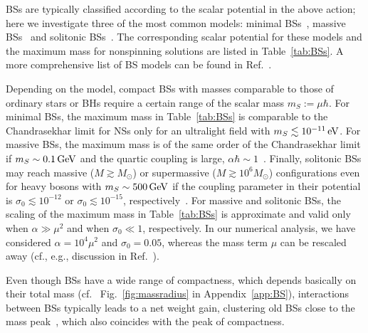 \documentclass[aps,twocolumn,showpacs,preprintnumbers,nofootinbib,prd,superscriptaddress,groupedaddress,10pt]{revtex4-1}
\begin{document}
BSs are typically classified according to the scalar potential in the above action; here we investigate three of the most common models:
minimal BSs~\cite{Kaup:1968zz,Ruffini:1969qy}, massive BSs~\cite{Colpi:1986ye} and
solitonic BSs~\cite{Friedberg:1986tq}. The corresponding scalar potential for these models and the maximum mass for nonspinning solutions are listed in Table~\ref{tab:BSs}. A more comprehensive list of BS models can be found in Ref.~\cite{Liebling:2012fv}.


Depending on the model, compact BSs with masses comparable to those of ordinary stars or BHs require a certain range of the scalar mass $m_S:= \mu \hbar$.
%
For minimal BSs, the maximum mass in Table~\ref{tab:BSs} is comparable to the Chandrasekhar limit for NSs only for an ultralight field with $m_S\lesssim 10^{-11}\,{\rm eV}$.
%
For massive BSs, the maximum mass is of the same order of the Chandrasekhar
limit if $m_S\sim 0.1\,{\rm GeV}$ and the quartic coupling is large, $\alpha\hbar\sim1$~\cite{Colpi:1986ye}.
%
Finally, solitonic BSs may reach massive ($M\gtrsim M_{\odot}$) or supermassive ($M\gtrsim 10^6 M_{\odot}$) configurations even for
heavy bosons with $m_S\sim 500\,{\rm GeV}$ if the coupling parameter in their potential is $\sigma_0\lesssim 10^{-12}$ or $\sigma_0\lesssim 10^{-15}$, respectively~\cite{Friedberg:1986tq}. For massive and solitonic BSs, the scaling of the maximum mass in Table~\ref{tab:BSs} is approximate and valid only when $\alpha\gg \mu^2$ and when $\sigma_0\ll1$, respectively. In our numerical analysis, we have considered $\alpha=10^4\mu^2$ and $\sigma_0=0.05$, whereas the mass term $\mu$ can be rescaled away (cf., e.g., discussion in Ref.~\cite{Macedo:2013jja}).

Even though BSs have a wide range of compactness, which depends basically on their total mass (cf.~ Fig.~\ref{fig:massradius} in Appendix~\ref{app:BS}),
interactions between BSs typically leads to a net weight gain, clustering old BSs close to the mass peak~\cite{Brito:2015yfh}, which also coincides with the peak of compactness.
\end{document}
